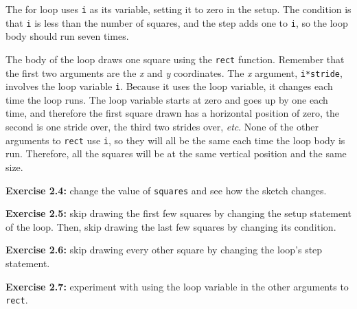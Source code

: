 \documentclass[
]{leaflet}
\begin{document}
The for loop uses \texttt{i} as its variable, setting it to zero in the setup.
The condition is that \texttt{i} is less than the number of squares, and the step adds one to \texttt{i}, so the loop body should run seven times.

The body of the loop draws one square using the \texttt{rect} function.
Remember that the first two arguments are the \textit{x} and \textit{y} coordinates.
The \textit{x} argument, \texttt{i*stride}, involves the loop variable \texttt{i}.
Because it uses the loop variable, it changes each time the loop runs.
The loop variable starts at zero and goes up by one each time, and therefore the first square drawn has a horizontal position of zero, the second is one stride over, the third two strides over, \textit{etc}.
None of the other arguments to \texttt{rect} use \texttt{i}, so they will all be the same each time the loop body is run.
Therefore, all the squares will be at the same vertical position and the same size.

\textbf{Exercise 2.4:} change the value of \texttt{squares} and see how the sketch changes.

\textbf{Exercise 2.5:} skip drawing the first few squares by changing the setup statement of the loop.
Then, skip drawing the last few squares by changing its condition.

\textbf{Exercise 2.6:} skip drawing every other square by changing the loop's step statement.

\textbf{Exercise 2.7:} experiment with using the loop variable in the other arguments to \texttt{rect}.



\loggingall
\end{document}
